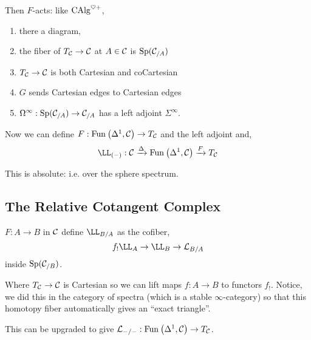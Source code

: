 \documentclass[12pt]{article}
\begin{document}
\begin{prop}
Then $F$-acts: like $\mathrm{CAlg}^{\heartsuit +}$,
\begin{enumerate}
\item there a diagram,
\begin{center}
\end{center}
\item the fiber of $T_{\mathcal{C}} \to \mathcal{C}$ at $A \in \mathcal{C}$ is $\mathrm{Sp}(\mathcal{C}_{/A})$

\item $T_{\mathcal{C}} \to \mathcal{C}$ is both Cartesian and coCartesian

\item $G$ sends Cartesian edges to Cartesian edges

\item $\Omega^\infty : \mathrm{Sp}(\mathcal{C}_{/A}) \to \mathcal{C}_{/A}$ has a left adjoint $\Sigma^\infty$.
\end{enumerate}
\end{prop}

Now we can define $F : \mathrm{Fun}_{}\left(\Delta^1, \mathcal{C}\right) \to T_{\mathcal{C}}$ and the left adjoint and,
\[ \LL_{(-)} : \C \xrightarrow{\Delta} \Fun{}{\Delta^1}{\C} \xrightarrow{F} T_\C \]

\begin{rmk}
This is absolute: i.e. over the sphere spectrum. 
\end{rmk}

\subsection{The Relative Cotangent Complex}

\begin{defn}
$F : A \to B$ in $\mathcal{C}$ define $\LL_{B/A}$ as the cofiber,
\[ f_! \LL_A \to \LL_B \to \L_{B/A} \]
inside $\mathrm{Sp}(\mathcal{C}_{/B})$.
\end{defn}

\begin{rmk}
Where $T_{\mathcal{C}} \to \mathcal{C}$ is Cartesian so we can lift maps $f : A \to B$ to functors $f_!$. Notice, we did this in the category of spectra (which is a stable $\infty$-category) so that this homotopy fiber automatically gives an ``exact triangle''.
\end{rmk}

This can be upgraded to give $\mathcal{L}_{-/-} : \mathrm{Fun}_{}\left(\Delta^1, \mathcal{C}\right) \to T_{\mathcal{C}}$.
\end{document}
